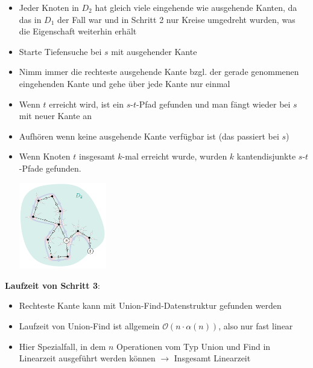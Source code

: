 \begin{itemize}
	\item Jeder Knoten in $D_2$ hat gleich viele eingehende wie ausgehende Kanten, da das in $D_1$ der Fall war und in Schritt 2 nur Kreise umgedreht wurden, was die Eigenschaft weiterhin erhält
	\item Starte Tiefensuche bei $s$ mit ausgehender Kante
	\item Nimm immer die rechteste ausgehende Kante bzgl. der gerade genommenen eingehenden Kante und gehe über jede Kante nur einmal
	\item Wenn $t$ erreicht wird, ist ein $s$-$t$-Pfad gefunden und man fängt wieder bei $s$ mit neuer Kante an
	\item Aufhören wenn keine ausgehende Kante verfügbar ist (das passiert bei $s$)
	\item Wenn Knoten $t$ insgesamt $k$-mal erreicht wurde, wurden $k$ kantendisjunkte $s$-$t$-Pfade gefunden.
	\begin{center}
		\includegraphics[width=0.3\textwidth]{images/menger-6.png}
	\end{center}
\end{itemize}

\textbf{Laufzeit von Schritt 3}:
\begin{itemize}
	\item Rechteste Kante kann mit Union-Find-Datenstruktur gefunden werden
	\item Laufzeit von Union-Find ist allgemein $\mathcal{O}(n\cdot\alpha(n))$, also nur fast linear
	\item Hier Spezialfall, in dem $n$ Operationen vom Typ Union und Find in Linearzeit ausgeführt werden können $\rightarrow$ Insgesamt Linearzeit
\end{itemize}

